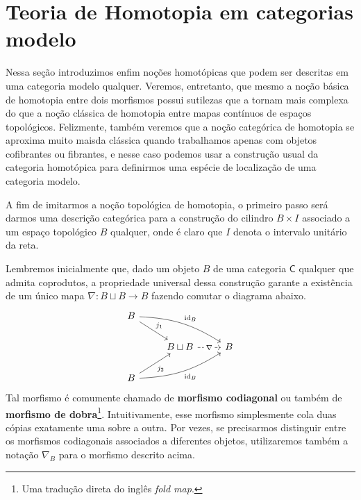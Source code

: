 \section{Teoria de Homotopia em categorias modelo}

Nessa seção introduzimos enfim noções homotópicas que podem ser descritas em uma categoria modelo qualquer.
Veremos, entretanto, que mesmo a noção básica de homotopia entre dois morfismos possui sutilezas que a tornam mais complexa do que a noção clássica de homotopia entre mapas contínuos de espaços topológicos.
Felizmente, também veremos que a noção categórica de homotopia se aproxima muito maisda clássica quando trabalhamos apenas com objetos cofibrantes ou fibrantes, e nesse caso podemos usar a construção usual da categoria homotópica para definirmos uma espécie de localização de uma categoria modelo.

A fim de imitarmos a noção topológica de homotopia, o primeiro passo será darmos uma descrição categórica para a construção do cilindro $B \times I$ associado a um espaço topológico $B$ qualquer, onde é claro que $I$ denota o intervalo unitário da reta.

Lembremos inicialmente que, dado um objeto $B$ de uma categoria $\mathsf{C}$ qualquer que admita coprodutos, a propriedade universal dessa construção garante a existência de um único mapa $\nabla: B \sqcup B \to B$ fazendo comutar o diagrama abaixo.
\begin{displaymath}
  \begin{tikzcd}
    B
    \arrow[rd, "j_{1}"]
    \arrow[rrd, bend left=15, "\id_{B}"]
    \\ & B \sqcup B
    \arrow[r, dashed, "\nabla" description]
    & B
    \\ B
    \arrow[ru, "j_{2}" swap]
    \arrow[rru, bend right=15, "\id_{B}" swap]
  \end{tikzcd}
\end{displaymath}
Tal morfismo é comumente chamado de \textbf{morfismo codiagonal} ou também de \textbf{morfismo de dobra}\footnote{Uma tradução direta do inglês \emph{fold map}.}.
Intuitivamente, esse morfismo simplesmente cola duas cópias exatamente uma sobre a outra.
Por vezes, se precisarmos distinguir entre os morfismos codiagonais associados a diferentes objetos, utilizaremos também a notação $\nabla_{B}$ para o morfismo descrito acima.

